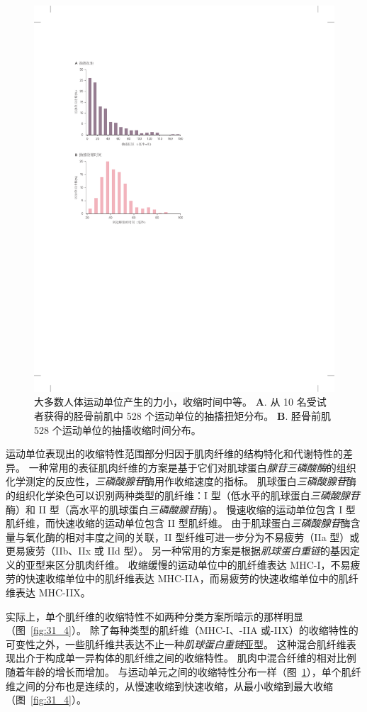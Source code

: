 \begin{figure}[htbp]
	\centering
	\includegraphics[width=0.65\linewidth]{chap31/fig_31_3}
	\caption{大多数人体运动单位产生的力小，收缩时间中等\cite{cutsem1997mechanical}。
	\textbf{A}. 从 10 名受试者获得的胫骨前肌中 528 个运动单位的抽搐扭矩分布。
	\textbf{B}. 胫骨前肌 528 个运动单位的抽搐收缩时间分布。}
	\label{fig:31_3}
\end{figure}


运动单位表现出的收缩特性范围部分归因于肌肉纤维的结构特化和代谢特性的差异。
一种常用的表征肌肉纤维的方案是基于它们对肌球蛋白\textit{腺苷三磷酸酶}的组织化学测定的反应性，\textit{三磷酸腺苷}酶用作收缩速度的指标。
肌球蛋白\textit{三磷酸腺苷}酶的组织化学染色可以识别两种类型的肌纤维：I 型（低水平的肌球蛋白\textit{三磷酸腺苷}酶）和 II 型（高水平的肌球蛋白\textit{三磷酸腺苷}酶）。
慢速收缩的运动单位包含 I 型肌纤维，而快速收缩的运动单位包含 II 型肌纤维。
由于肌球蛋白\textit{三磷酸腺苷}酶含量与氧化酶的相对丰度之间的关联，II 型纤维可进一步分为不易疲劳（IIa 型）或更易疲劳（IIb、IIx 或 IId 型）。
另一种常用的方案是根据\textit{肌球蛋白重链}的基因定义的亚型来区分肌肉纤维。
收缩缓慢的运动单位中的肌纤维表达 MHC-I，不易疲劳的快速收缩单位中的肌纤维表达 MHC-IIA，而易疲劳的快速收缩单位中的肌纤维表达 MHC-IIX。


实际上，单个肌纤维的收缩特性不如两种分类方案所暗示的那样明显（图~\ref{fig:31_4}）。
除了每种类型的肌纤维（MHC-I、-IIA 或-IIX）的收缩特性的可变性之外，一些肌纤维共表达不止一种\textit{肌球蛋白重链}亚型。
这种混合肌纤维表现出介于构成单一异构体的肌纤维之间的收缩特性。
肌肉中混合纤维的相对比例随着年龄的增长而增加。
与运动单元之间的收缩特性分布一样（图~\ref{fig:31_3}），单个肌纤维之间的分布也是连续的，从慢速收缩到快速收缩，从最小收缩到最大收缩（图~\ref{fig:31_4}）。


